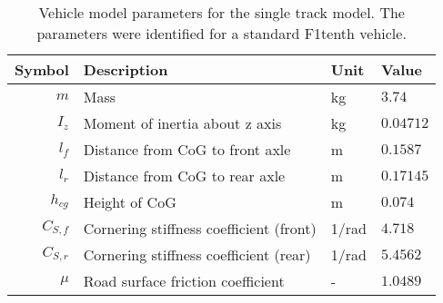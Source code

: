 \begin{table}[!htb]
\centering
\begin{tabular}{rlll} 
    \hline
    \textbf{Symbol} & \textbf{Description} & \textbf{Unit} & \textbf{Value}\\ 
    \hline
    $m$ & Mass & kg & $3.74$ \\ 
    $I_z$ & Moment of inertia about z axis & kg & $0.04712$ \\
    $l_f$ & Distance from CoG to front axle & m & $0.1587$ \\
    $l_r$ & Distance from CoG to rear axle & m & $0.17145$ \\
    $h_{cg}$ & Height of CoG & m & $0.074$ \\
    $C_{S,f}$ & Cornering stiffness coefficient (front) & 1/rad & $4.718$ \\
    $C_{S,r}$ & Cornering stiffness coefficient (rear) & 1/rad & $5.4562$ \\
    $\mu$ & Road surface friction coefficient & - & $1.0489$ \\
    \hline
\end{tabular}
\caption[Vehicle model parameters for the single track model]{Vehicle model parameters for the single track model. The parameters were identified for a standard F1tenth vehicle.}
\label{tab:vehicle_parameters}
\end{table}
